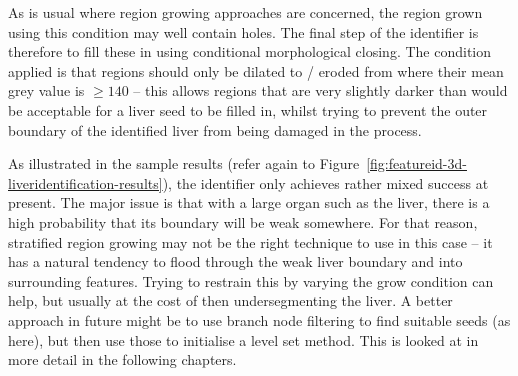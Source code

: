 %
As is usual where region growing approaches are concerned, the region grown using this condition may well contain holes. The final step of the identifier is therefore to fill these in using conditional morphological closing. The condition applied is that regions should only be dilated to / eroded from where their mean grey value is $\ge 140$ -- this allows regions that are very slightly darker than would be acceptable for a liver seed to be filled in, whilst trying to prevent the outer boundary of the identified liver from being damaged in the process.

As illustrated in the sample results (refer again to Figure~\ref{fig:featureid-3d-liveridentification-results}), the identifier only achieves rather mixed success at present. The major issue is that with a large organ such as the liver, there is a high probability that its boundary will be weak somewhere. For that reason, stratified region growing may not be the right technique to use in this case -- it has a natural tendency to flood through the weak liver boundary and into surrounding features. Trying to restrain this by varying the grow condition can help, but usually at the cost of then undersegmenting the liver. A better approach in future might be to use branch node filtering to find suitable seeds (as here), but then use those to initialise a level set method. This is looked at in more detail in the following chapters.

